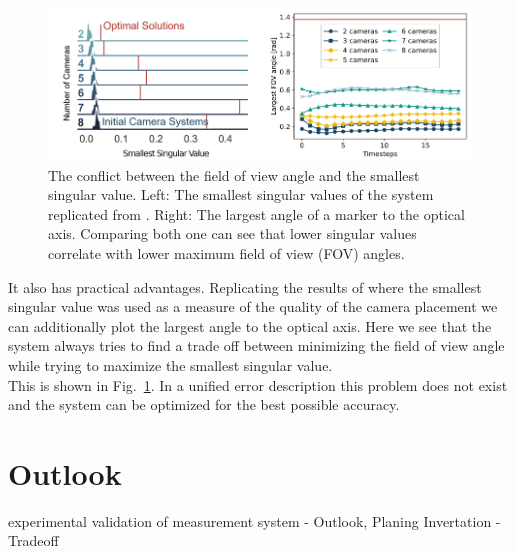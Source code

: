\documentclass[5p,times,procedia]{elsarticle}
\begin{document}
\begin{figure}[!htb]
	\centering
	\includegraphics[width=\columnwidth]{graphics/fov_sv_conflict.png}
	\caption{The conflict between the field of view angle and the smallest singular value. Left: The smallest singular values of the system replicated from \cite{camera_placement}. Right: The largest angle of a marker to the optical axis.
		Comparing both one can see that lower singular values correlate with lower maximum field of view (FOV) angles.}
	\label{fig:fov_sv_conflict}
\end{figure}

It also has practical advantages.
Replicating the results of \cite{camera_placement} where the smallest singular value was used as a measure of the quality of the camera placement we can additionally plot the largest angle to the optical axis.
Here we see that the system always tries to find a trade off between minimizing the field of view angle while trying to maximize the smallest singular value.\\
This is shown in Fig.~\ref{fig:fov_sv_conflict}.
In a unified error description this problem does not exist and the system can be optimized for the best possible accuracy.



\section{Outlook}
experimental validation of measurement system
- Outlook, Planing Invertation
- Tradeoff



%
\end{document}
